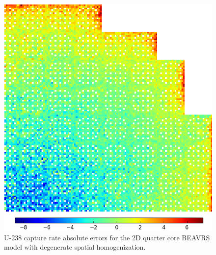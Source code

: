 \begin{figure}[h!]
\centering
\includegraphics[width=\linewidth]{figures/patterns/lns/full-core/capt-err-degenerate}
\vspace{2mm}
\caption[U-238 capture rate absolute errors for \ac{BEAVRS} with degenerate homogenization]{U-238 capture rate absolute errors for the 2D quarter core \ac{BEAVRS} model with degenerate spatial homogenization.}
\label{fig:chap9-full-core-capt-err-degenerate}
\end{figure}

